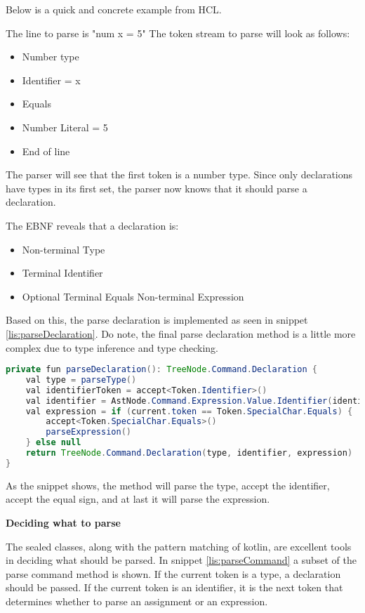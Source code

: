 Below is a quick and concrete example from HCL. 

The line to parse is "num x = 5" The token stream to parse will look as follows:

\begin{itemize}
	\item Number type
	\item Identifier = x
	\item Equals
	\item Number Literal = 5
	\item End of line
\end{itemize}

The parser will see that the first token is a number type. 
Since only declarations have types in its first set, the parser now knows that it should parse a declaration.

The EBNF reveals that a declaration is:
\begin{itemize}
	\item Non-terminal Type
	\item Terminal Identifier
	\item Optional
	\subitem Terminal Equals
	\subitem Non-terminal Expression
\end{itemize}

Based on this, the parse declaration is implemented as seen in snippet \ref{lis:parseDeclaration}.
Do note, the final parse declaration method is a little more complex due to type inference and type checking.

\begin{lstlisting}[language=java,label=lis:parseDeclaration,caption=A simplified version of the parse declaration method from the parser.]
private fun parseDeclaration(): TreeNode.Command.Declaration {
    val type = parseType()
    val identifierToken = accept<Token.Identifier>()
    val identifier = AstNode.Command.Expression.Value.Identifier(identifierToken.value)
    val expression = if (current.token == Token.SpecialChar.Equals) {
	    accept<Token.SpecialChar.Equals>()
	    parseExpression()
    } else null
    return TreeNode.Command.Declaration(type, identifier, expression)
}
\end{lstlisting}

As the snippet shows, the method will parse the type, accept the identifier, accept the equal sign, and at last it will parse the expression.

\textbf{Deciding what to parse}

The sealed classes, along with the pattern matching of kotlin, are excellent tools in deciding what should be parsed. 
In snippet \ref{lis:parseCommand} a subset of the parse command method is shown. 
If the current token is a type, a declaration should be passed. 
If the current token is an identifier, it is the next token that determines whether to parse an assignment or an expression.

